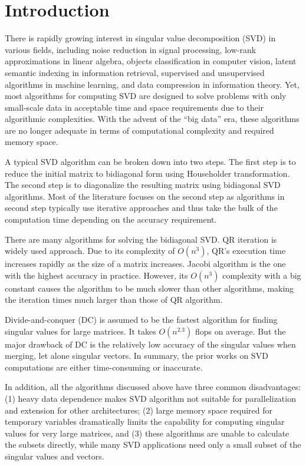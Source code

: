 \section{Introduction}
\label{sec:intro}
There is rapidly growing interest in singular value decomposition (SVD) in various fields,
including noise reduction in signal processing,
low-rank approximations in linear algebra, 
objects classification in computer vision,
latent semantic indexing in information retrieval,
supervised and unsupervised algorithms in machine learning,
and data compression in information theory.
Yet, most algorithms for computing SVD are designed to solve problems
with only small-scale data in acceptable time and space requirements
due to their algorithmic complexities.
With the advent of the ``big data'' era, these algorithms are no longer adequate in terms of computational complexity and required memory space.

A typical SVD algorithm can be broken down into two steps\cite{65SIAM}.
The first step is to reduce the initial matrix to bidiagonal form using Householder transformation.
The second step is to diagonalize the resulting matrix using bidiagonal SVD algorithms.
Most of the literature focuses on the second step as algorithms in second step typically use iterative approaches\cite{58iter1,90iter2,65iter3} and thus take the bulk of the computation time depending on the accuracy requirement.

There are many algorithms for solving the bidiagonal SVD.
QR iteration is widely used approach.
Due to its complexity of $O(n^3)$, QR's execution time increases rapidly as the size of a matrix increases.
Jacobi algorithm is the one with the highest accuracy in practice\cite{97bookalgebra}.
However, its $O(n^3)$ complexity with a big constant causes the algorithm to be much slower than other algorithms, making the iteration times much larger than those of QR algorithm.

Divide-and-conquer (DC) is assumed to be the fastest algorithm for finding singular values for large matrices\cite{94DCSVD}.
It takes $O(n^{2.3})$ flops on average\cite{97bookalgebra}. 
But the major drawback of DC is the relatively low accuracy of the
singular values when merging, let alone singular vectors. 
In summary, the prior works on SVD computations are either time-consuming or inaccurate.

In addition, all the algorithms discussed above have three common disadvantages:
(1) heavy data dependence makes SVD algorithm not suitable for parallelization and extension for other architectures;
(2) large memory space required for temporary variables dramatically limits the capability for computing singular values for very large matrices, and
(3) these algorithms are unable to calculate the subsets directly, while many SVD applications
need only a small subset of the singular values and vectors.


